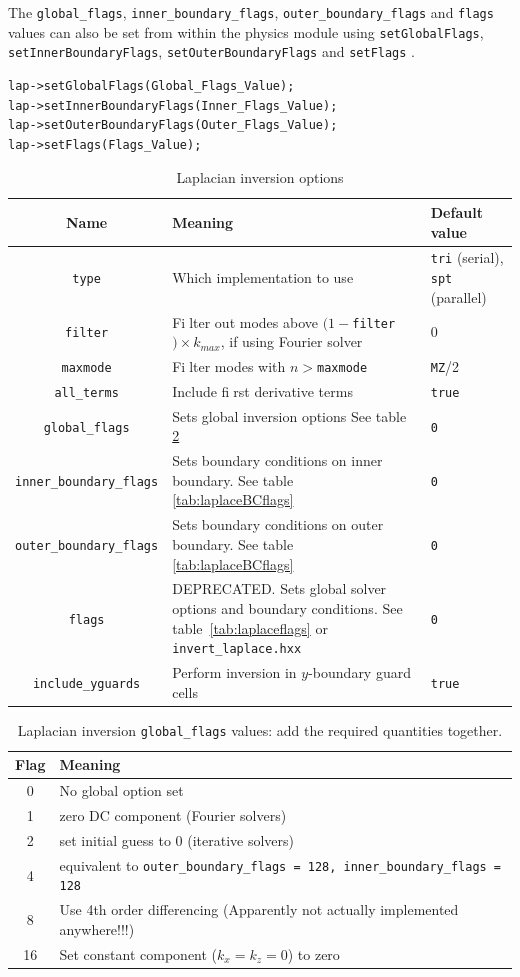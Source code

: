 \documentclass[12pt]{article}
\newcommand{\code}[1]{\texttt{#1}}
\begin{document}
The \code{global\_flags}, \code{inner\_boundary\_flags},
\code{outer\_boundary\_flags} and \code{flags} values can also be set from
within the physics module using
%
\lstinline!setGlobalFlags!,  \lstinline!setInnerBoundaryFlags!,
\lstinline!setOuterBoundaryFlags! and  \lstinline!setFlags!
%
.
%
\begin{lstlisting}
lap->setGlobalFlags(Global_Flags_Value);
lap->setInnerBoundaryFlags(Inner_Flags_Value);
lap->setOuterBoundaryFlags(Outer_Flags_Value);
lap->setFlags(Flags_Value);
\end{lstlisting}
%
\begin{table}
\caption{Laplacian inversion options}
%
\label{tab:laplacesettings}
%
\centering
%
\begin{tabular}[c]{c | p{8cm} | p{2.5cm}}
\hline
Name & Meaning & Default value\\
\hline
\code{type} & Which implementation to use & \code{tri} (serial),  \code{spt} (parallel) \\
\code{filter} & Fi􏰀lter out modes above $(1-$\code{filter}$)\times k_{max}$, if using Fourier solver & 0\\
\code{maxmode} & Fi􏰀lter modes with $n >$\code{maxmode} & \code{MZ}/2 \\
\code{all\_terms} & Include fi􏰀rst derivative terms & \code{true}\\
\code{global\_flags} & Sets global inversion options See table \ref{tab:laplaceglobalflags}& \code{0}\\
\code{inner\_boundary\_flags} & Sets boundary conditions on inner boundary.  See table \ref{tab:laplaceBCflags} & \code{0}\\
\code{outer\_boundary\_flags} & Sets boundary conditions on outer boundary.  See table \ref{tab:laplaceBCflags}& \code{0}\\
\code{flags} & DEPRECATED. Sets global solver options and boundary conditions.  See table~\ref{tab:laplaceflags} or \code{invert\_laplace.hxx} & \code{0} \\
\code{include\_yguards} & Perform inversion in $y$-boundary guard
cells & \code{true}\\
\hline
\end{tabular}
%
\end{table}
%
\begin{table}
\caption{Laplacian inversion \code{global\_flags} values: add the required
quantities together.}
%
\label{tab:laplaceglobalflags}
%
\centering
%
\begin{tabular}[c]{c|l}
\hline
Flag & Meaning \\
\hline
0 &  No global option set \\
1 &  zero DC component (Fourier solvers) \\
2 &  set initial guess to 0 (iterative solvers) \\
4 &  equivalent to \code{outer\_boundary\_flags = 128, inner\_boundary\_flags = 128}\\
8 & Use 4th order differencing (Apparently not actually implemented anywhere!!!) \\
16 & Set constant component ($k_x = k_z = 0$) to zero \\
\hline
\end{tabular}
%
\end{table}
\end{document}
